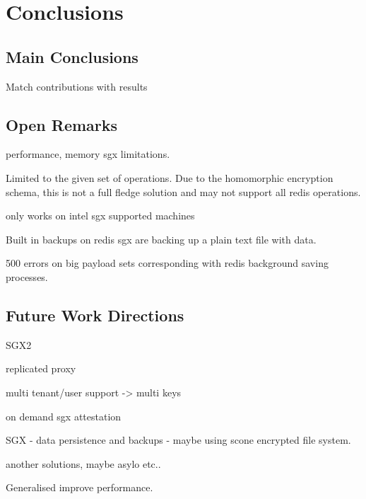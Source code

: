 
\chapter{Conclusions}
\label{cha:conclusions}

\section{Main Conclusions}
\label{sec:main_conclusion}

Match contributions with results

\section{Open Remarks}
\label{sec:open_remarks}

performance, memory sgx limitations.

Limited to the given set of operations. Due to the homomorphic encryption schema, this is not a full fledge solution and may not support all redis operations.

only works on intel sgx supported machines

Built in backups on redis sgx are backing up a plain text file with data.

500 errors on big payload sets corresponding with redis background saving processes.

\section{Future Work Directions}
\label{sec:future_work_directions}

SGX2

replicated proxy

multi tenant/user support -> multi keys

on demand sgx attestation

SGX - data persistence and backups - maybe using scone encrypted file system.

another solutions, maybe asylo etc..

Generalised improve performance.